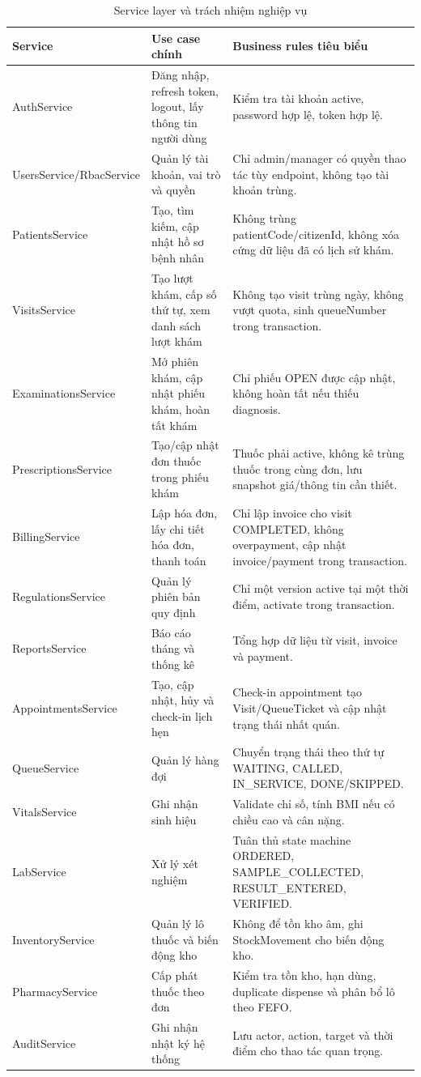 \begin{longtable}{|p{4cm}|p{5.2cm}|p{5.3cm}|}
\caption{Service layer và trách nhiệm nghiệp vụ}\\
\hline
\textbf{Service} & \textbf{Use case chính} & \textbf{Business rules tiêu biểu} \\
\hline
AuthService & Đăng nhập, refresh token, logout, lấy thông tin người dùng & Kiểm tra tài khoản active, password hợp lệ, token hợp lệ. \\
\hline
UsersService/\allowbreak RbacService & Quản lý tài khoản, vai trò và quyền & Chỉ admin/manager có quyền thao tác tùy endpoint, không tạo tài khoản trùng. \\
\hline
PatientsService & Tạo, tìm kiếm, cập nhật hồ sơ bệnh nhân & Không trùng patientCode/citizenId, không xóa cứng dữ liệu đã có lịch sử khám. \\
\hline
VisitsService & Tạo lượt khám, cấp số thứ tự, xem danh sách lượt khám & Không tạo visit trùng ngày, không vượt quota, sinh queueNumber trong transaction. \\
\hline
ExaminationsService & Mở phiên khám, cập nhật phiếu khám, hoàn tất khám & Chỉ phiếu OPEN được cập nhật, không hoàn tất nếu thiếu diagnosis. \\
\hline
PrescriptionsService & Tạo/cập nhật đơn thuốc trong phiếu khám & Thuốc phải active, không kê trùng thuốc trong cùng đơn, lưu snapshot giá/thông tin cần thiết. \\
\hline
BillingService & Lập hóa đơn, lấy chi tiết hóa đơn, thanh toán & Chỉ lập invoice cho visit COMPLETED, không overpayment, cập nhật invoice/payment trong transaction. \\
\hline
RegulationsService & Quản lý phiên bản quy định & Chỉ một version active tại một thời điểm, activate trong transaction. \\
\hline
ReportsService & Báo cáo tháng và thống kê & Tổng hợp dữ liệu từ visit, invoice và payment. \\
\hline
AppointmentsService & Tạo, cập nhật, hủy và check-in lịch hẹn & Check-in appointment tạo Visit/QueueTicket và cập nhật trạng thái nhất quán. \\
\hline
QueueService & Quản lý hàng đợi & Chuyển trạng thái theo thứ tự WAITING, CALLED, IN\_SERVICE, DONE/SKIPPED. \\
\hline
VitalsService & Ghi nhận sinh hiệu & Validate chỉ số, tính BMI nếu có chiều cao và cân nặng. \\
\hline
LabService & Xử lý xét nghiệm & Tuân thủ state machine ORDERED, SAMPLE\_COLLECTED, RESULT\_ENTERED, VERIFIED. \\
\hline
InventoryService & Quản lý lô thuốc và biến động kho & Không để tồn kho âm, ghi StockMovement cho biến động kho. \\
\hline
PharmacyService & Cấp phát thuốc theo đơn & Kiểm tra tồn kho, hạn dùng, duplicate dispense và phân bổ lô theo FEFO. \\
\hline
AuditService & Ghi nhận nhật ký hệ thống & Lưu actor, action, target và thời điểm cho thao tác quan trọng. \\
\hline
\end{longtable}

